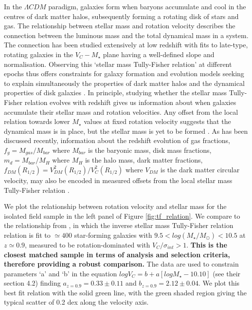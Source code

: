 \documentclass[fleqn,usenatbib]{mnras}
\begin{document}
In the $\Lambda CDM$ paradigm, galaxies form when baryons accumulate and cool in the centres of dark matter halos, subsequently forming a rotating disk of stars and gas.
The relationship between stellar mass and rotation velocity describes the connection between the luminous mass and the total dynamical mass in a system.
The connection has been studied extensively at low redshift \citep[e.g.][]{Bell2000a,Rhee2003,Reyes2011} with fits to late-type, rotating galaxies in the $V_{C}-M_{\star}$ plane having a well-defined slope and normalisation.
Observing this `stellar mass Tully-Fisher relation' at different epochs thus offers constraints for galaxy formation and evolution models seeking to explain simultaneously the properties of dark matter halos and the dynamical properties of disk galaxies \citep[e.g.][]{Dubois2014,Vogelsberger2014b,Schaye2015}.
In principle, studying whether the stellar mass Tully-Fisher relation evolves with redshift gives us information about when galaxies accumulate their stellar mass and rotation velocities.
Any offset from the local relation towards lower $M_{\star}$ values at fixed rotation velocity suggests that the dynamical mass is in place, but the stellar mass is yet to be formed \citep[e.g.][]{Puech2008,Cresci2009,Puech2010,Gnerucci2011,Swinbank2012,Straatman2017,Ubler2017}.
As has been discussed recently, information about the redshift evolution of gas fractions, $f_{g} = M_{gas}/M_{bar}$ where $M_{bar}$ is the baryonic mass, disk mass fractions, $m_{d} = M_{bar}/M_{H}$  where $M_{H}$ is the halo mass, dark matter fractions, $f_{DM}(R_{1/2}) = V^{2}_{DM}(R_{1/2})/V^{2}_{C}(R_{1/2})$ where $V_{DM}$ is the dark matter circular velocity, may also be encoded in measured offsets from the local stellar mass Tully-Fisher relation \citep{Wuyts2016b,Ubler2017,Genzel2017}.


We plot the relationship between rotation velocity and stellar mass for the isolated field sample in the left panel of Figure \ref{fig:tf_relation}.
We compare to the relationship from \cite{Harrison2017}, in which the inverse stellar mass Tully-Fisher relation relation is fit to $\simeq400$ star-forming galaxies with $9.5 < log(M_{\star}/M_{\odot}) < 10.5$ at $z\simeq0.9$, measured to be rotation-dominated with $V_{C}/\sigma_{int} > 1$.
\textbf{This is the closest matched sample in terms of analysis and selection criteria, therefore providing a robust comparison.}
The data are used to constrain parameters `a' and `b' in the equation $logV_{C}=b+a[logM_{\star} - 10.10]$ (see their section 4.2) finding $a_{z=0.9} = 0.33 \pm 0.11$ and $b_{z=0.9} = 2.12 \pm 0.04$.
We plot this best fit relation with the solid green line, with the green shaded region giving the typical scatter of 0.2 dex along the velocity axis.
\end{document}
